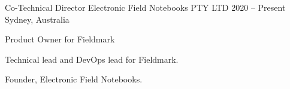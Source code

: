 

\begin{cventries}
\cventry
    {Co-Technical Director} %
    {Electronic Field Notebooks PTY LTD} %
    {2020 -- Present} %
    {Sydney, Australia} %
    {\begin{cvitems}%
    \item {Product Owner for Fieldmark}
    \item {Technical lead and DevOps lead for Fieldmark.}
    \item {Founder, Electronic Field Notebooks.}
    \end{cvitems}%
    }


\end{cventries}
